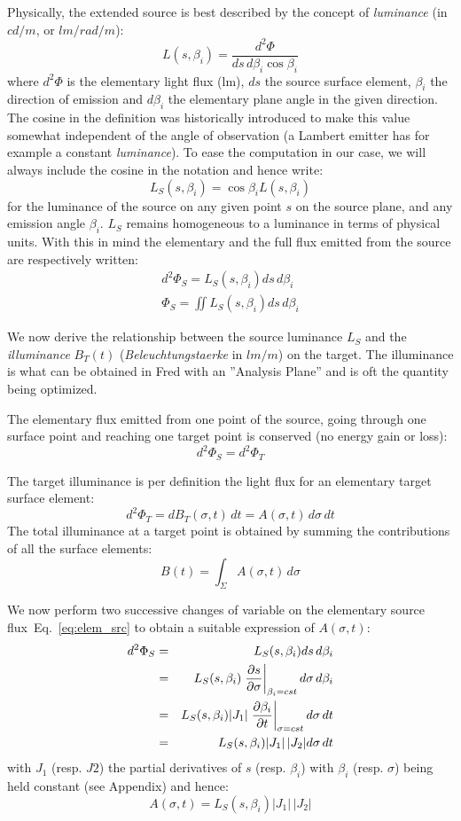 Physically, the extended source is best described by the concept
of \emph{luminance} (in $cd/m$, or $lm/rad/m$):
\[ L(s, \beta_i) = \frac{d^2\Phi}{ds\,d\beta_i \cos \beta_i}  \]
where $d^2\Phi$ is the elementary light flux (lm), $ds$ the source
surface element, $\beta_i$ the direction of emission and $d\beta_i$
the elementary plane angle in the given direction.
The cosine in the definition was historically introduced to make this
value somewhat independent of the angle of observation 
(a  Lambert emitter has for example a constant \emph{luminance}).
To ease the computation in our case, we will always include 
the cosine in the notation and hence
write:
\[ L_S (s, \beta_i) = \cos\beta_i L(s, \beta_i) \]
for the luminance of the source on any given point 
$s$ on the source plane, and any emission angle
$\beta_i$. $L_S$ remains homogeneous to a luminance in terms of 
physical units.
With this in mind the elementary and the full flux emitted 
from the source are respectively written:
\begin{eqnarray}
\label{eq:elem_src}
 d^2\Phi_S = L_S (s, \beta_i)ds\,d\beta_i \\
 \Phi_S = \iint L_S (s, \beta_i) ds\,d\beta_i
\end{eqnarray}

We now derive the relationship between the source luminance $L_S$
and the \emph{illuminance} $B_T(t)$ (\emph{Beleuchtungstaerke} in $lm/m$) 
on the target. The illuminance is what can be obtained in Fred 
with an ''Analysis Plane'' and is oft the quantity being
optimized.

The elementary flux emitted
from one point of the source, going through one surface point
and reaching one target point is conserved (no energy gain or loss):
\[  d^2\Phi_S = d^2\Phi_T \]

The target illuminance is per definition the light flux for an elementary
target surface element:
\[ d^2\Phi_T = dB_T(\sigma, t)\,dt = A(\sigma, t)\,d\sigma\,dt\] 
The total illuminance at a target point is obtained by summing the contributions
of all the surface elements:
\begin{equation}
 B(t) = \int_\Sigma A(\sigma, t)\,d\sigma
\label{eq:beleuch}
\end{equation}

We now perform two successive changes of variable on the elementary source
flux~Eq.~\eqref{eq:elem_src} to obtain a suitable expression of $A(\sigma, t)$:
\begin{eqnarray*}
d^2\Phi_S &= & L_S(s, \beta_i)ds\,d\beta_i \\
    &      = & L_S(s, \beta_i) \left. \frac{\partial{s}}{\partial{\sigma}} 
            \right|_{\beta_i=cst} d\sigma\,d\beta_i \\
    &      = & L_S(s, \beta_i)|J_1| \left. \frac{\partial{\beta_i}}{\partial{t}}
             \right|_{\sigma=cst} d\sigma\,dt \\    
    &      = & L_S(s, \beta_i)|J_1|\,|J_2| d\sigma\,dt \\    
\end{eqnarray*}
with $J_1$ (resp. $J2$) the partial derivatives of $s$ (resp. $\beta_i$) with 
$\beta_i$ (resp. $\sigma$) being held constant (see Appendix) and hence:
\[ A(\sigma, t) =  L_S(s, \beta_i)|J_1|\,|J_2|\]

